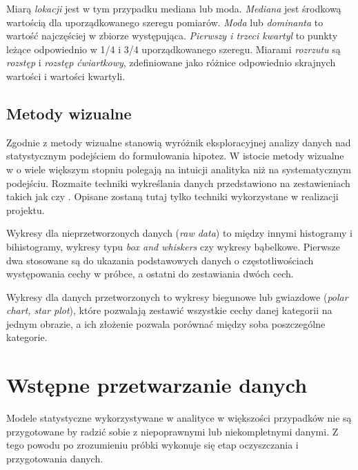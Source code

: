 \documentclass[12pt,a4paper,oneside]{report} %
\begin{document}
Miarą \emph{lokacji} jest w tym przypadku mediana lub moda. \emph{Mediana} jest środkową wartością dla uporządkowanego szeregu pomiarów. \emph{Moda} lub \emph{dominanta} to wartość najczęściej w zbiorze występująca. \emph{Pierwszy i trzeci kwartyl} to punkty leżące odpowiednio w 1/4 i 3/4 uporządkowanego szeregu. Miarami \emph{rozrzutu} są \emph{rozstęp} i \emph{rozstęp ćwiartkowy}, zdefiniowane jako różnice odpowiednio skrajnych wartości i wartości kwartyli. \par

\subsection{Metody wizualne}

Zgodnie z \cite{nist} metody wizualne stanowią wyróżnik eksploracyjnej analizy danych nad statystycznym podejściem do formułowania hipotez. W istocie metody wizualne w o wiele większym stopniu polegają na intuicji analityka niż na systematycznym podejściu. Rozmaite techniki wykreślania danych przedstawiono na zestawieniach takich jak \cite{visual-literacy} czy \cite{viz-catalogue}. Opisane zostaną tutaj tylko techniki wykorzystane w realizacji projektu. \par

Wykresy dla nieprzetworzonych danych (\emph{raw data}) to między innymi histogramy i bihistogramy, wykresy typu \emph{box and whiskers} czy wykresy bąbelkowe. Pierwsze dwa stosowane są do ukazania podstawowych danych o częstotliwościach występowania cechy w próbce, a ostatni do zestawiania dwóch cech. \par

Wykresy dla danych przetworzonych to wykresy biegunowe lub gwiazdowe (\emph{polar chart, star plot}), które pozwalają zestawić wszystkie cechy danej kategorii na jednym obrazie, a ich złożenie pozwala porównać między soba poszczególne kategorie. \par

\section{Wstępne przetwarzanie danych}

Modele statystyczne wykorzystywane w analityce w większości przypadków nie są przygotowane by radzić sobie z niepoprawnymi lub niekompletnymi danymi. Z tego powodu po zrozumieniu próbki wykonuje się etap oczyszczania i przygotowania danych. \par
\end{document}
